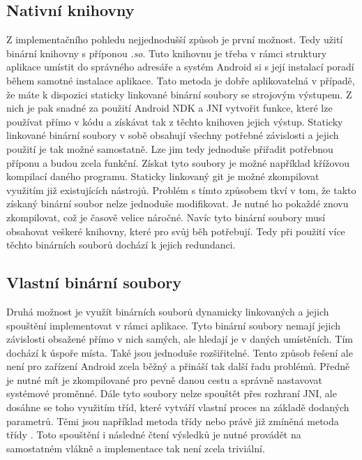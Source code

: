     \subsection{Nativní knihovny}
    Z implementačního pohledu nejjednodušší způsob je první možnost. Tedy užití binární knihovny s příponou \emph{.so}. Tuto knihovnu je třeba v rámci struktury aplikace umístit do správného adresáře a systém Android si s její instalací poradí během samotné instalace aplikace. Tato metoda je dobře aplikovatelná v případě, že máte k dispozici staticky linkované binární soubory se strojovým výstupem. Z nich je pak snadné za použití Android NDK a JNI vytvořit funkce, které lze používat přímo v kódu a získávat tak z těchto knihoven jejich výstup. Staticky linkované binární soubory v sobě obsahují všechny potřebné závislosti a jejich použití je tak možné samostatně. Lze jim tedy jednoduše přiřadit potřebnou příponu a budou zcela funkční. Získat tyto soubory je možné například křížovou kompilací daného programu. Staticky linkovaný git je možné zkompilovat využitím již existujících nástrojů. Problém s tímto způsobem tkví v tom, že takto získaný binární soubor nelze jednoduše modifikovat. Je nutné ho pokaždé znovu zkompilovat, což je časově velice náročné. Navíc tyto binární soubory musí obsahovat veškeré knihovny, které pro svůj běh potřebují. Tedy při použití více těchto binárních souborů dochází k jejich redundanci.

    \subsection{Vlastní binární soubory}\label{subsec:dyn_binaries}
    Druhá možnost je využít binárních souborů dynamicky linkovaných a jejich spouštění implementovat v rámci aplikace. Tyto binární soubory nemají jejich závislosti obsažené přímo v nich samých, ale hledají je v daných umístěních. Tím dochází k úspoře místa. Také jsou jednoduše rozšiřitelné. Tento způsob řešení ale není pro zařízení Android zcela běžný a přináší tak další řadu problémů. Předně je nutné mít je zkompilované pro pevně danou cestu a správně nastavovat systémové proměnné. Dále tyto soubory nelze spouštět přes rozhraní JNI, ale dosáhne se toho využitím tříd, které vytváří vlastní proces na základě dodaných parametrů. Těmi jsou například metoda  třídy  nebo právě již zmíněná metoda  třídy . Toto spouštění i následné čtení výsledků je nutné provádět na samostatném vlákně a implementace tak není zcela triviální.

